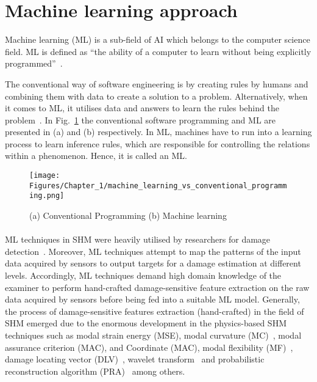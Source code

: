 \section{Machine learning approach}
\label{sec31}
Machine learning (ML) is a sub-field of AI which belongs to the computer science field. 
ML is defined as \enquote{the ability of a computer to learn without being explicitly programmed}~\cite{munoz2014machine}.

The conventional way of software engineering is by creating rules by humans and combining them with data to create a solution to a problem.
Alternatively, when it comes to ML, it utilises data and answers to learn the rules behind the problem~\cite{franoischollet2017learning}.
In Fig.~\ref{fig:Machine_learning} the conventional software programming and ML are presented in (a) and (b) respectively.
In ML, machines have to run into a learning process to learn inference rules, which are responsible for controlling the relations within a phenomenon. Hence, it is called an ML.
\begin{figure} [!ht]
	\begin{center}
		\centering
		\texttt{[image: Figures/Chapter\_1/machine\_learning\_vs\_conventional\_programming.png]}
	\end{center}
	\caption{(a) Conventional Programming	(b) Machine learning} 
	\label{fig:Machine_learning}
\end{figure}
\paragraph{}
ML techniques in SHM were heavily utilised by researchers for damage detection~\cite{raghavan2008effects, Su2009, Mitra2016}.
Moreover, ML techniques attempt to map the patterns of the input data acquired by sensors to output targets for a damage estimation at different levels. 
Accordingly, ML techniques demand high domain knowledge of the examiner to perform hand-crafted damage-sensitive feature extraction on the raw data acquired by sensors before being fed into a suitable ML model.
Generally, the process of damage-sensitive features extraction (hand-crafted) in the field of SHM emerged due to the enormous development in the physics-based SHM techniques such as modal strain energy (MSE)\cite{Kim}, modal curvature (MC)~\cite{Wahab}, modal assurance criterion (MAC), and Coordinate (MAC)\cite{Allemang2003}, modal flexibility (MF)~\cite{Jaishi}, damage locating vector (DLV)~\cite{Bernal2002}, wavelet transform~\cite{Staszewski,Kima} and probabilistic reconstruction algorithm (PRA)~\cite{Hay2006} among others.

